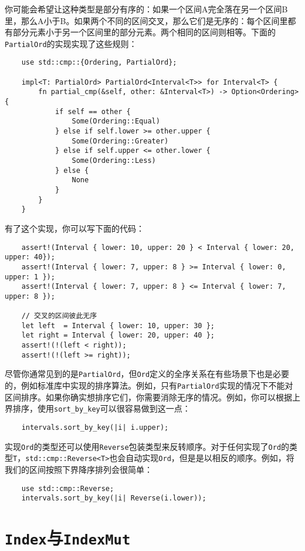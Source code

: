 你可能会希望让这种类型是部分有序的：如果一个区间A完全落在另一个区间B里，那么A小于B。如果两个不同的区间交叉，那么它们是无序的：每个区间里都有部分元素小于另一个区间里的部分元素。两个相同的区间则相等。下面的\texttt{PartialOrd}的实现实现了这些规则：
\begin{verbatim}
    use std::cmp::{Ordering, PartialOrd};

    impl<T: PartialOrd> PartialOrd<Interval<T>> for Interval<T> {
        fn partial_cmp(&self, other: &Interval<T>) -> Option<Ordering> {
            if self == other {
                Some(Ordering::Equal)
            } else if self.lower >= other.upper {
                Some(Ordering::Greater)
            } else if self.upper <= other.lower {
                Some(Ordering::Less)
            } else {
                None
            }
        }
    }
\end{verbatim}

有了这个实现，你可以写下面的代码：
\begin{verbatim}
    assert!(Interval { lower: 10, upper: 20 } < Interval { lower: 20, upper: 40});
    assert!(Interval { lower: 7, upper: 8 } >= Interval { lower: 0, upper: 1 });
    assert!(Interval { lower: 7, upper: 8 } <= Interval { lower: 7, upper: 8 });

    // 交叉的区间彼此无序
    let left  = Interval { lower: 10, upper: 30 };
    let right = Interval { lower: 20, upper: 40 };
    assert!(!(left < right));
    assert!(!(left >= right));
\end{verbatim}

尽管你通常见到的是\texttt{PartialOrd}，但\texttt{Ord}定义的全序关系在有些场景下也是必要的，例如标准库中实现的排序算法。例如，只有\texttt{PartialOrd}实现的情况下不能对区间排序。如果你确实想排序它们，你需要消除无序的情况。例如，你可以根据上界排序，使用\texttt{sort\_by\_key}可以很容易做到这一点：
\begin{verbatim}
    intervals.sort_by_key(|i| i.upper);
\end{verbatim}

实现\texttt{Ord}的类型还可以使用\texttt{Reverse}包装类型来反转顺序。对于任何实现了\texttt{Ord}的类型\texttt{T}，\texttt{std::cmp::Reverse<T>}也会自动实现\texttt{Ord}，但是是以相反的顺序。例如，将我们的区间按照下界降序排列会很简单：
\begin{verbatim}
    use std::cmp::Reverse;
    intervals.sort_by_key(|i| Reverse(i.lower));
\end{verbatim}

\section{\texttt{Index}与\texttt{IndexMut}}\label{index}


